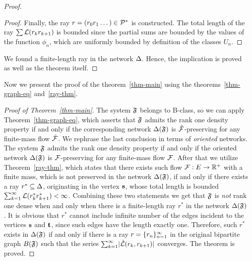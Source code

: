 \documentclass[12pt]{amsart}
\begin{document}
\begin{proof}
\begin{proof}
          Finally, the ray $r = (r_0 r_1 \dots) \in \cal{P}^*$ is constructed.
          The total length of the ray $\sum \len(r_k r_{k+1})$ is bounded since the partial sums are bounded by the values of the function $\phi_n$,
           which are uniformly bounded by definition of the classes $U_n$.
        \end{proof}
        We found a finite-length ray in the network $\net$.
        Hence, the implication is proved as well as the theorem itself.
      \end{proof}

      Now we present the proof of the theorem~\ref{thm-main} using the theorems~\ref{thm-graph-eq} and~\ref{ray-thm}.
      \begin{proof}[Proof of Theorem~\ref{thm-main}]
        The system $\fsys$ belongs to B-class, so we can apply Theorem~\ref{thm-graph-eq}, which asserts
          that $\fsys$ admits the rank one density property if and only if
          the corresponding network $\net(\fsys)$ is $\flow$-preserving for any
          finite-mass flow $\flow$.
        We rephrase the last conclusion in terms of \emph{oriented} networks.
        The system $\fsys$ admits the rank one density property if and only if
          the oriented network $\net(\fsys)$ is $\flowpos$-preserving for any
          finite-mass flow $\flowpos$.
        After that we utilize Theorem~\ref{ray-thm}, which states that there exists such
          flow $\flowpos: E \to \mathbb{R}^{+}$ with a finite mass, which is not preserved in
          the network $\net(\fsys)$, if and only if there exists a ray $r^{*} \subseteq \net$, originating in the vertex $\source$,
          whose total length is bounded $\sum_{k=1}^\infty \len(r^{*}_k r^{*}_{k+1}) < \infty$.
        Combining these two statements we get that $\fsys$ is \emph{not} rank one dense when and only when there is a finite-length ray $r^*$ in the network $\net(\fsys)$.
        It is obvious that $r^*$ cannot include infinite number of the edges incident to the vertices
          $\source$ and $\sink$, since such edges have the length exactly one.
        Therefore, such $r^*$ exists in $\net(\fsys)$ if and only if there is a ray $r=\seq{r}$ in the original bipartite graph $B(\fsys)$ such that
          the series $\sum_{k=1}^\infty\lvert\wt(r_k, r_{k+1})\rvert$ converges.
        The theorem is proved.
      \end{proof}
\end{document}
